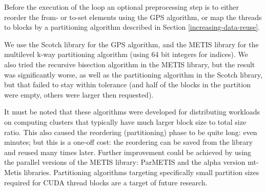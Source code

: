 Before the execution of the loop an optional preprocessing step is to either
reorder the from- or to-set elements using the GPS algorithm, or map the threads
to blocks by a partitioning algorithm described in Section
\ref{increasing-data-reuse}.

We use the Scotch library\cite{scotch} for the GPS algorithm, and the
METIS\cite{metis} library for the multilevel k-way partitioning algorithm (using
64 bit integers for indices). We also tried the recursive bisection algorithm in
the METIS library, but the result was significantly worse, as well as the
partitioning algorithm in the Scotch library, but that failed to stay within
tolerance (and half of the blocks in the partition were empty, others were
larger then requested).

It must be noted that these algorithms were developed for distributing workloads
on computing clusters that typically have much larger block size to total size
ratio. This also caused the reordering (partitioning) phase to be quite long:
even minutes; but this is a one-off cost: the reordering can be saved from the
library and reused many times later. Further improvement could be achieved by
using the parallel versions of the METIS library: ParMETIS\cite{parmetis} and
the alpha version mt-Metis\cite{mtmetis} libraries. Partitioning algorithms
targeting specifically small partition sizes required for CUDA thread blocks are
a target of future research.

